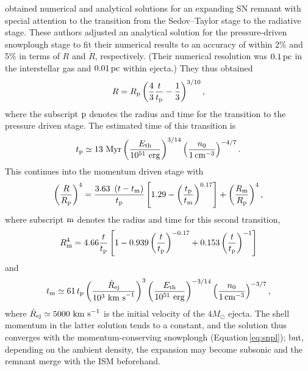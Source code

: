\documentclass[fleqn,usenatbib]{mnras}
\newcommand\EST{E_{\rm th}}
\newcommand\Myr{~ {\rm Myr}}
\newcommand\erg{~ {\rm erg}}
\newcommand\kms{~ {\rm km~ s}^{-1}}
\def\cmcube{{\,{\rm cm}^{-3}}}
\begin{document}
  \citet{Cioffi88} obtained numerical and analytical solutions for an expanding
  SN remnant with special attention to the transition from the Sedov--Taylor 
  stage to the radiative stage.
  These authors adjusted an analytical solution for the pressure-driven 
  snowplough stage to fit their numerical results to an accuracy of within 2\%
  and 5\% in terms of $R$ and $\dot R$, respectively.
  (Their numerical resolution was $0.1\,{\rm pc}$ in the interstellar gas and $0.01\,{\rm pc}$
  within ejecta.)  They thus obtained
  \begin{equation}
    \label{eq:pds}
    R=R_{\rm{p}} \left(\frac{4}{3}\frac{t}{t_{\rm{p}}}-
    \frac{1}{3}\right)^{3/10},
  \end{equation}
  where the subscript ${\rm{p}}$ denotes the radius and time for the transition
  to the pressure driven stage.
  The estimated time of this transition is 
  \begin{equation}
  t_{\rm{p}}\simeq13\Myr\left(\frac{\EST}{10^{51}\erg}\right)^{3/14}
     \left(\frac{n_0}{1 \cmcube}
            \right)^{-4/7}. 
  \end{equation}
  This continues into the momentum driven stage with
  \begin{equation}
    \label{eq:mcs}
    \left(\frac{R}{R_{\rm{p}}}\right)^{4}=
    \frac{3.63~\left(t-t_{\rm{m}}\right)}{t_{\rm{p}}}
    \left[1.29-\left(\frac{t_{\rm{p}}}{t_{\rm{m}}}\right)^{0.17}\right] +
    \left( \frac{R_{\rm{m}}}{R_{\rm{p}}}\right)^{4},
  \end{equation}
  where subscript ${\rm{m}}$ denotes the radius and time for this second
  transition,
\begin{equation}
    R_{\rm{m}}^4 = 4.66 \frac{t}{t_{\rm{p}}}\left[1-0.939\left(\frac{t}{t_{\rm{p}}}\right)^{-0.17}
            +0.153\left( \frac{t}{t_{\rm{p}}}\right)^{-1}\right]
\end{equation}
 and
  \begin{equation}
  t_{\rm{m}}\simeq 61\, t_\mathrm{p}
                 \left(\frac{\dot{R}_{\rm{ej}}}{10^3\kms}\right)^3
                 \left(\frac{\EST}{10^{51}\erg}\right)^{-3/14}
                 \left(\frac{n_0}{1\cmcube}\right)^{-3/7},
  \end{equation}
  where $\dot{R}_{\rm{ej}}\simeq5000\kms$ is the initial velocity of the
  $4M_\odot$ ejecta.
  The shell momentum in the latter solution tends to a constant, and the
  solution thus converges with the momentum-conserving snowplough 
  (Equation\,\eqref{eq:snpl});
  but, depending on the ambient density, the expansion may
  become subsonic and the remnant merge with the ISM beforehand. 
\end{document}
